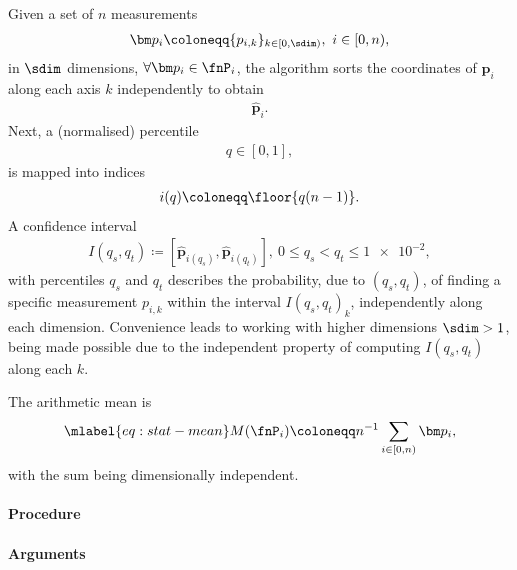 %
Given a set of $n$ measurements 
\begin{align*}
  \bm p_i \coloneqq \{ p_{i,k} \}_{k \in [0,\sdim)},\ i \in [0,n),
\end{align*}
in $\sdim$ dimensions, $\forall \bm p_i \in \fnP_i$, the algorithm sorts the coordinates of $\bm p_i$ along each axis $k$ independently to obtain
\begin{align*}
  \widehat{\bm p}_i.
\end{align*}
Next, a (normalised) percentile
\begin{align*}
  q \in [0, 1],
\end{align*}
is mapped into indices
\begin{align*}
  i(q) \coloneqq \floor{q (n-1)}.
\end{align*}
A confidence interval
\begin{align*}
  I(q_s, q_t) \coloneqq [\widehat{\bm p}_{i(q_s)}, \widehat{\bm p}_{i(q_t)}],\ 0 \leq q_s < q_t \leq \num{1e-2},
\end{align*}
with percentiles $q_s$ and $q_t$ describes the probability, due to $(q_s, q_t)$, of finding a specific measurement $p_{i,k}$ within the interval $I(q_s, q_t)_k$, independently along each dimension. Convenience leads to working with higher dimensions $\sdim >1$, being made possible due to the independent property of computing $I(q_s, q_t)$ along each $k$.

The arithmetic mean is
\begin{align}\mlabel{eq:stat-mean}
  M(\fnP_i) \coloneqq n^{-1} \sum_{i\in[0,n)} \bm p_i,
\end{align}
with the sum being dimensionally independent.


\paragraph{Procedure}

\begin{synopsis}
\end{synopsis}

\paragraph{Arguments}

